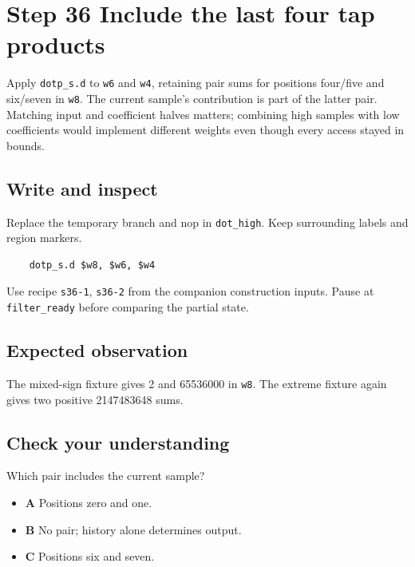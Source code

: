 \section{Step 36 Include the last four tap products}\label{fir-s36}

Apply \texttt{dotp\_s.d} to \texttt{w6} and \texttt{w4}, retaining pair sums for positions four/five and six/seven in \texttt{w8}. The current sample’s contribution is part of the latter pair. Matching input and coefficient halves matters; combining high samples with low coefficients would implement different weights even though every access stayed in bounds.

\subsection{Write and inspect}
Replace the temporary branch and nop in \texttt{dot\_high}. Keep surrounding labels and region markers.

\begin{verbatim}
    dotp_s.d $w8, $w6, $w4
\end{verbatim}
Use recipe \texttt{s36-1}, \texttt{s36-2} from the companion construction inputs. Pause at \texttt{filter\_ready} before comparing the partial state.

\subsection{Expected observation}
The mixed-sign fixture gives 2 and 65536000 in \texttt{w8}. The extreme fixture again gives two positive 2147483648 sums.

\subsection{Check your understanding}
Which pair includes the current sample?

\begin{itemize}
  \item \textbf{A} Positions zero and one.
  \item \textbf{B} No pair; history alone determines output.
  \item \textbf{C} Positions six and seven.
\end{itemize}
